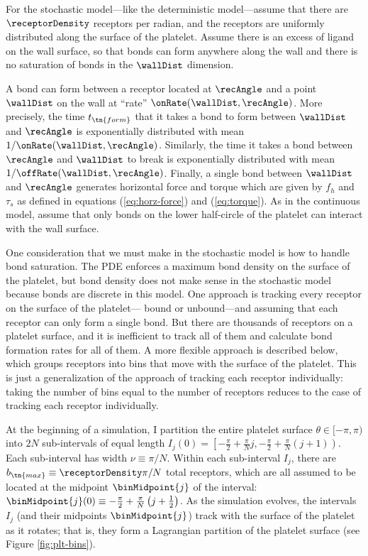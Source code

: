 For the stochastic model---like the deterministic model---assume that
there are $\receptorDensity$ receptors per radian, and the receptors
are uniformly distributed along the surface of the platelet. Assume
there is an excess of ligand on the wall surface, so that bonds can
form anywhere along the wall and there is no saturation of bonds in
the $\wallDist$ dimension.

A bond can form between a receptor located at $\recAngle$ and a point
$\wallDist$ on the wall at ``rate'' $\onRate(\wallDist,
\recAngle)$. More precisely, the time $t_\tn{form}$ that it takes a
bond to form between $\wallDist$ and $\recAngle$ is exponentially
distributed with mean $1/\onRate(\wallDist, \recAngle)$. Similarly,
the time it takes a bond between $\recAngle$ and $\wallDist$ to break
is exponentially distributed with mean
$1/\offRate(\wallDist, \recAngle)$. Finally, a single bond between
$\wallDist$ and $\recAngle$ generates horizontal force and torque
which are given by $f_h$ and $\tau_s$ as defined in equations
(\ref{eq:horz-force}) and (\ref{eq:torque}). As in the continuous
model, assume that only bonds on the lower half-circle of the platelet
can interact with the wall surface.

One consideration that we must make in the stochastic model is how to
handle bond saturation. The PDE enforces a maximum bond density on the
surface of the platelet, but bond density does not make sense in the
stochastic model because bonds are discrete in this model. One
approach is tracking every receptor on the surface of the platelet---
bound or unbound---and assuming that each receptor can only form a
single bond. But there are thousands of receptors on a platelet
surface, and it is inefficient to track all of them and calculate bond
formation rates for all of them. A more flexible approach is described
below, which groups receptors into bins that move with the surface of
the platelet. This is just a generalization of the approach of
tracking each receptor individually: taking the number of bins
equal to the number of receptors reduces to the case of tracking each
receptor individually.

At the beginning of a simulation, I partition the entire platelet
surface $\theta \in [-\pi, \pi)$ into $2N$ sub-intervals of equal
length
$I_j(0) = \left[-\frac{\pi}{2} + \frac{\pi}{N}j, -\frac{\pi}{2} +
  \frac{\pi}{N} (j+1)\right)$. Each sub-interval has width
$\nu \equiv \pi/N$. Within each sub-interval $I_j$, there are
$b_\tn{max} \equiv \receptorDensity \pi/N$ total receptors, which are
all assumed to be located at the midpoint $\binMidpoint{j}$ of the
interval:
$\binMidpoint{j}(0) \equiv -\frac{\pi}{2} + \frac{\pi}{N} \left( j +
  \frac{1}{2} \right)$. As the simulation evolves, the intervals $I_j$
(and their midpoints $\binMidpoint{j}$) track with the surface of the
platelet as it rotates; that is, they form a Lagrangian partition of
the platelet surface (see Figure \ref{fig:plt-bins}).

